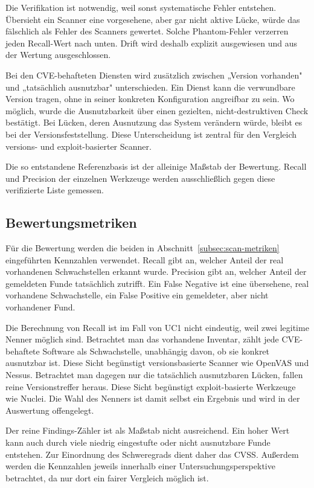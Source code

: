 Die Verifikation ist notwendig, weil sonst systematische Fehler entstehen. Übersieht ein Scanner eine
vorgesehene, aber gar nicht aktive Lücke, würde das fälschlich als Fehler des Scanners gewertet.
Solche Phantom-Fehler verzerren jeden Recall-Wert nach unten. Drift wird deshalb explizit
ausgewiesen und aus der Wertung ausgeschlossen.

Bei den CVE-behafteten Diensten wird zusätzlich zwischen „Version vorhanden" und „tatsächlich
ausnutzbar" unterschieden. Ein Dienst kann die verwundbare Version tragen, ohne in seiner konkreten
Konfiguration angreifbar zu sein. Wo möglich, wurde die Ausnutzbarkeit über einen gezielten,
nicht-destruktiven Check bestätigt. Bei Lücken, deren Ausnutzung das System verändern würde, bleibt
es bei der Versionsfeststellung. Diese Unterscheidung ist zentral für den Vergleich versions- und
exploit-basierter Scanner.

Die so entstandene Referenzbasis ist der alleinige Maßstab der Bewertung. Recall und Precision der
einzelnen Werkzeuge werden ausschließlich gegen diese verifizierte Liste gemessen.

\subsection{Bewertungsmetriken}
\label{subsec:uc1-metriken}

Für die Bewertung werden die beiden in Abschnitt~\ref{subsec:scan-metriken} eingeführten Kennzahlen
verwendet. Recall gibt an, welcher Anteil der real vorhandenen Schwachstellen erkannt wurde.
Precision gibt an, welcher Anteil der gemeldeten Funde tatsächlich zutrifft. Ein False Negative ist
eine übersehene, real vorhandene Schwachstelle, ein False Positive ein gemeldeter, aber nicht
vorhandener Fund.

Die Berechnung von Recall ist im Fall von UC1 nicht eindeutig, weil zwei legitime Nenner möglich
sind. Betrachtet man das vorhandene Inventar, zählt jede CVE-behaftete Software als Schwachstelle,
unabhängig davon, ob sie konkret ausnutzbar ist. Diese Sicht begünstigt versionsbasierte Scanner wie
OpenVAS und Nessus. Betrachtet man dagegen nur die tatsächlich ausnutzbaren Lücken, fallen reine
Versionstreffer heraus. Diese Sicht begünstigt exploit-basierte Werkzeuge wie Nuclei. Die Wahl des
Nenners ist damit selbst ein Ergebnis und wird in der Auswertung offengelegt.

Der reine Findings-Zähler ist als Maßstab nicht ausreichend. Ein hoher Wert kann auch durch viele
niedrig eingestufte oder nicht ausnutzbare Funde entstehen. Zur Einordnung des Schweregrads dient
daher das CVSS. Außerdem werden die Kennzahlen jeweils innerhalb einer Untersuchungsperspektive
betrachtet, da nur dort ein fairer Vergleich möglich ist.


